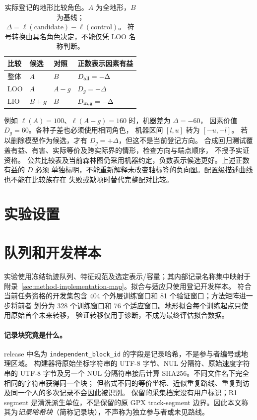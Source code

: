 \begin{table}[htbp]
\centering\small
\caption{实际登记的地形比较角色。\(A\) 为全地形，\(B\) 为基线；
\(\Delta=\ell(\mathrm{candidate})-\ell(\mathrm{control})\)。
符号转换由具名角色决定，不能仅凭 LOO 名称判断。}
\label{tab:terrain-sign-roles}\hypertarget{tab:terrain-sign-roles}{}
\begin{tabular}{llll}
\toprule 比较 & 候选 & 对照 & 正数表示因素有益\\\midrule
整体 & \(A\) & \(B\) & \(D_{\rm all}=-\Delta\)\\
LOO & \(A\) & \(A-g\) & \(D_g=-\Delta\)\\
LIO & \(B+g\) & \(B\) & \(D_{\rm in,g}=-\Delta\)\\
\bottomrule
\end{tabular}
\end{table}
例如 \(\ell(A)=100\)、\(\ell(A-g)=160\) 时，机器差为 \(\Delta=-60\)，
因素价值 \(D_g=60\)。各种子差也必须使用相同角色，
机器区间 \([l,u]\) 转为 \([-u,-l]\)。
若以删除模型作为候选，才有 \(D_g=+\Delta\)，但这不是当前登记方向。
合成回归测试覆盖有益、有害、实际等价及跨实际界的情形，检查方向与端点顺序，
不授予实证资格。
公共比较表及当前森林图仍采用机器约定，负数表示候选更好。上述正数有益的 \(D\) 必须
单独标明，不能重新解释未改变轴标签的负向图。配置级描述曲线也不能在比较族存在
失败或缺项时替代完整配对比较。


\section{实验设置}
\label{sec:protocol}\hypertarget{sec:protocol}{}

\section{队列和开发样本}
实验使用冻结轨迹队列、特征规范及选定表示/容量；其内部记录名称集中映射于
附录~\ref{sec:method-implementation-map}。拟合与适应只使用登记开发样本。
符合当前任务资格的开发集包含 404 个外层训练窗口和 81 个验证窗口；方法矩阵进一步将前者
划分为 328 个训练窗口和 76 个适应窗口。地形拟合每个训练起点只使用原始首个未来转移，
验证转移仅用于诊断，不成为最终评估拟合数据。

\paragraph{记录块究竟是什么。}
release 中名为 \texttt{independent\_block\_id} 的字段是记录哈希，不是参与者编号或地理区域。
构建器将原始坐标字符串的 UTF-8 字节、NUL 分隔符、原始速度字符串的 UTF-8 字节及另一个
NUL 分隔符串接后计算 SHA256。不同文件名下完全相同的字符串获得同一个块；
但格式不同的等价坐标、近似重复路线、重复到访及同一个人的多次记录不会因此被识别。
保留的采集档案没有用户标识；R1 segment 是清洗派生单位，不是保留的原 GPX track-segment
边界。因此本文称其为\emph{记录哈希块}（简称记录块），不声称为独立参与者或未见路线。

